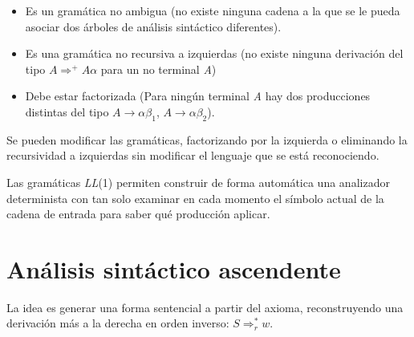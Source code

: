 \begin{itemize}
\item Es un gramática no ambigua (no existe ninguna cadena a la que se le pueda asociar dos árboles de análisis sintáctico diferentes).
\item Es una gramática no recursiva a izquierdas  (no existe ninguna derivación del tipo $A\Rightarrow^{+}A\alpha$ para un no terminal \textit{A}) 
\item Debe estar factorizada (Para ningún terminal \textit{A} hay dos producciones distintas del tipo $A\longrightarrow\alpha\beta_{1}$, $A\longrightarrow\alpha\beta_{2}$).

\end{itemize}


Se pueden modificar las gramáticas, factorizando por la izquierda o eliminando la recursividad a izquierdas sin modificar el lenguaje que se está reconociendo.



Las gramáticas \textit{LL}(1) permiten construir de forma automática una analizador determinista con tan solo examinar en cada momento el símbolo actual de la cadena de entrada para saber qué producción aplicar. 

%	
	

\section{Análisis sintáctico ascendente}


La idea es generar una forma sentencial a partir del axioma, reconstruyendo una derivación más a la derecha en orden inverso:  $S\Rightarrow_{r}^{*}w$.

